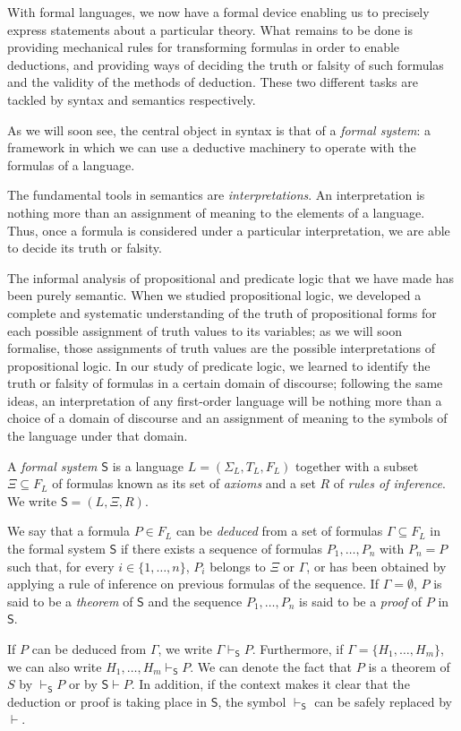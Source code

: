 \begin{para}
With formal languages, we now have a formal device enabling us to precisely express statements about a particular theory. What remains to be done is providing mechanical rules for transforming formulas in order to enable deductions, and providing ways of deciding the truth or falsity of such formulas and the validity of the methods of deduction.
These two different tasks are tackled by syntax and semantics respectively.

As we will soon see, the central object in syntax is that of a \emph{formal system}: a framework in which we can use a deductive machinery to operate with the formulas of a language.

The fundamental tools in semantics are \emph{interpretations}. An interpretation is nothing more than an assignment of meaning to the elements of a language. Thus, once a formula is considered under a particular interpretation, we are able to decide its truth or falsity.

The informal analysis of propositional and predicate logic that we have made has been purely semantic.
When we studied propositional logic, we developed a complete and systematic understanding of the truth of propositional forms for each possible assignment of truth values to its variables;
as we will soon formalise, those assignments of truth values are the possible interpretations of propositional logic.
In our study of predicate logic, we learned to identify the truth or falsity of formulas in a certain domain of discourse; 
following the same ideas, an interpretation of any first-order language will be nothing more than a choice of a domain of discourse and an assignment of meaning to the symbols of the language under that domain. 
\end{para}

\begin{definition}
A \emph{formal system} $\mathsf{S}$ is a language $L = (\Sigma_L, T_L, F_L)$ together with a subset $\Xi\subseteq F_L$ of formulas known as its set of \emph{axioms} and a set $R$ of \emph{rules of inference}.
We write $\mathsf{S} = (L,\Xi,R)$.

We say that a formula $P \in F_L$ can be \emph{deduced} from a set of formulas $\Gamma\subseteq F_L$ in the formal system $\mathsf{S}$ if there exists a sequence of formulas $P_1,\ldots,P_n$ with $P_n = P$ such that, for every $i\in \{1,\ldots,n\}$, $P_i$ belongs to $\Xi$ or $\Gamma$, or has been obtained by applying a rule of inference on previous formulas of the sequence. If $\Gamma = \emptyset$, $P$ is said to be a \emph{theorem} of $\mathsf{S}$ and the sequence $P_1,\ldots,P_n$ is said to be a \emph{proof} of $P$ in $\mathsf{S}$.

If $P$ can be deduced from $\Gamma$, we write $\Gamma \vdash_{\mathsf{S}} P$. Furthermore, if $\Gamma = \{H_1,\ldots,H_m\}$, we can also write $H_1,\ldots,H_m\vdash_{\mathsf{S}} P$. We can denote the fact that $P$ is a theorem of $S$ by $\vdash_{\mathsf{S}} P$ or by $\mathsf{S}\vdash P$. In addition, if the context makes it clear that the deduction or proof is taking place in $\mathsf{S}$, the symbol $\vdash_{\mathsf{S}}$ can be safely replaced by $\vdash$.
\end{definition}


